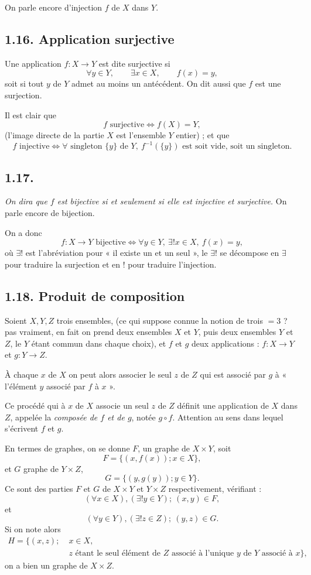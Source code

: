 On parle encore d'injection $f$ de $X$ dans $Y$.

\subsection*{1.16. Application surjective}
Une application $f:X\to Y$ est dite surjective si
\[
\forall y\in Y,\qquad \exists x\in X,\qquad f(x)=y,
\]
soit si tout $y$ de $Y$ admet au moins un antécédent. On dit aussi que $f$ est une surjection.

Il est clair que
\[
f\text{ surjective}\Leftrightarrow f(X)=Y,
\]
(l'image directe de la partie $X$ est l'ensemble $Y$ entier) ; et que
\[
f\text{ injective}\Leftrightarrow\forall\text{ singleton }\{y\}\text{ de }Y,\ f^{-1}(\{y\})\text{ est soit vide, soit un singleton}.
\]

\subsection*{1.17.}
\emph{On dira que $f$ est bijective si et seulement si elle est injective et surjective.} On parle encore de bijection.

On a donc
\[
f:X\longrightarrow Y\text{ bijective}\Leftrightarrow\forall y\in Y,\ \exists!x\in X,\ f(x)=y,
\]
où $\exists!$ est l'abréviation pour « il existe un et un seul », le $\exists!$ se décompose en $\exists$ pour traduire la surjection et en $!$ pour traduire l'injection.

\subsection*{1.18. Produit de composition}
Soient $X,Y,Z$ trois ensembles, (ce qui suppose connue la notion de trois $=3$ ? pas vraiment, en fait on prend deux ensembles $X$ et $Y$, puis deux ensembles $Y$ et $Z$, le $Y$ étant commun dans chaque choix), et $f$ et $g$ deux applications : $f:X\to Y$ et $g:Y\to Z$.

À chaque $x$ de $X$ on peut alors associer le seul $z$ de $Z$ qui est associé par $g$ à « l'élément $y$ associé par $f$ à $x$ ».

Ce procédé qui à $x$ de $X$ associe un seul $z$ de $Z$ définit une application de $X$ dans $Z$, appelée la \emph{composée de $f$ et de $g$}, notée $g\circ f$. Attention au sens dans lequel s'écrivent $f$ et $g$.

En termes de graphes, on se donne $F$, un graphe de $X\times Y$, soit
\[
F=\{(x,f(x));x\in X\},
\]
et $G$ graphe de $Y\times Z$,
\[
G=\{(y,g(y));y\in Y\}.
\]
Ce sont des parties $F$ et $G$ de $X\times Y$ et $Y\times Z$ respectivement, vérifiant :
\[
(\forall x\in X),(\exists!y\in Y);\ (x,y)\in F,
\]
et
\[
(\forall y\in Y),(\exists!z\in Z);\ (y,z)\in G.
\]
Si on note alors
\[
\begin{aligned}
H=\{(x,z);\;&x\in X,\\[-0.2em]
&z\text{ étant le seul élément de }Z\text{ associé à l'unique }y\text{ de }Y\text{ associé à }x\},
\end{aligned}
\]
on a bien un graphe de $X\times Z$.

